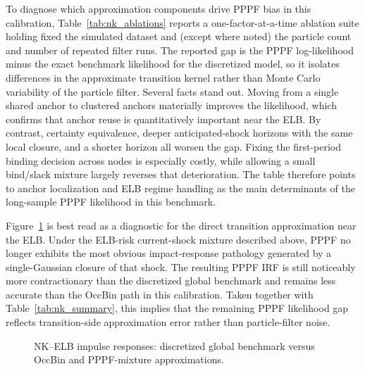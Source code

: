 \documentclass[11pt]{article}
\theoremstyle{remark}
\begin{document}
To diagnose which approximation components drive PPPF bias in this calibration, Table~\ref{tab:nk_ablations} reports a one-factor-at-a-time ablation suite holding fixed the simulated dataset and (except where noted) the particle count and number of repeated filter runs.
The reported gap is the PPPF log-likelihood minus the exact benchmark likelihood for the discretized model, so it isolates differences in the approximate transition kernel rather than Monte Carlo variability of the particle filter.
Several facts stand out.
Moving from a single shared anchor to clustered anchors materially improves the likelihood, which confirms that anchor reuse is quantitatively important near the ELB.
By contrast, certainty equivalence, deeper anticipated-shock horizons with the same local closure, and a shorter horizon all worsen the gap.
Fixing the first-period binding decision across nodes is especially costly, while allowing a small bind/slack mixture largely reverses that deterioration.
The table therefore points to anchor localization and ELB regime handling as the main determinants of the long-sample PPPF likelihood in this benchmark.

\begin{table}[t]
\centering
\scriptsize
\setlength{\tabcolsep}{3pt}

\caption{NK--ELB PPPF ablations: mean log-likelihood gap to the exact discretized benchmark, standard deviation across repeated filter runs, and mean ESS. All rows use $T=250$, $N=256$, and $N_{\mathrm{rep}}=30$ unless marked with $\dagger$, which indicates a reduced configuration ($T=50$, $N=4$, $N_{\mathrm{rep}}=2$) used only to illustrate the effect of per-particle anchoring.}
\label{tab:nk_ablations}
\end{table}

Figure~\ref{fig:nk_irf} is best read as a diagnostic for the direct transition approximation near the ELB.
Under the ELB-risk current-shock mixture described above, PPPF no longer exhibits the most obvious impact-response pathology generated by a single-Gaussian closure of that shock.
The resulting PPPF IRF is still noticeably more contractionary than the discretized global benchmark and remains less accurate than the OccBin path in this calibration.
Taken together with Table~\ref{tab:nk_summary}, this implies that the remaining PPPF likelihood gap reflects transition-side approximation error rather than particle-filter noise.

\begin{figure}[t]
\centering

\caption{NK--ELB impulse responses: discretized global benchmark versus OccBin and PPPF-mixture approximations.}
\label{fig:nk_irf}
\end{figure}
\end{document}
